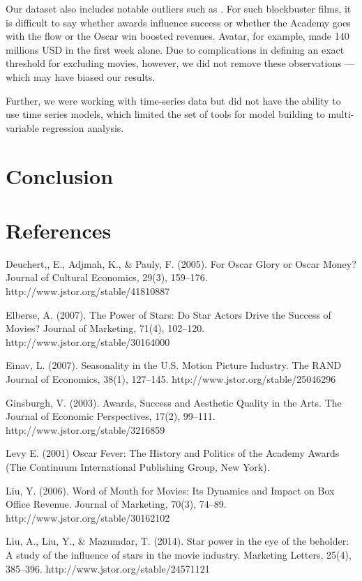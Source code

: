 \documentclass[11pt]{article} %
\begin{document}
Our dataset also includes notable outliers such as . For such blockbuster films, it is difficult to say whether awards influence success or whether the Academy goes with the flow or the Oscar win boosted revenues. Avatar, for example, made 140 millions USD in the first week alone. Due to complications in defining an exact threshold for excluding movies, however, we did not remove these observations — which may have biased our results. 

Further, we were working with time-series data but did not have the ability to use time series models, which limited the set of tools for model building to multi-variable regression analysis. 


\section{Conclusion}

\newpage
\section*{References}
\leftskip 0.3in
\parindent -0.3in

\noindent 

Deuchert,, E., Adjmah, K., & Pauly, F. (2005). For Oscar Glory or Oscar Money? Journal of Cultural Economics, 29(3), 159–176. http://www.jstor.org/stable/41810887 

Elberse, A. (2007). The Power of Stars: Do Star Actors Drive the Success of Movies? Journal of Marketing, 71(4), 102–120. http://www.jstor.org/stable/30164000 

Einav, L. (2007). Seasonality in the U.S. Motion Picture Industry. The RAND Journal of Economics, 38(1), 127–145. http://www.jstor.org/stable/25046296 
 
Ginsburgh, V. (2003). Awards, Success and Aesthetic Quality in the Arts. The Journal of Economic Perspectives, 17(2), 99–111. http://www.jstor.org/stable/3216859 

Levy E. (2001) Oscar Fever: The History and Politics of the Academy Awards (The Continuum International Publishing Group, New York). 

Liu, Y. (2006). Word of Mouth for Movies: Its Dynamics and Impact on Box Office Revenue. Journal of Marketing, 70(3), 74–89. http://www.jstor.org/stable/30162102

Liu, A., Liu, Y., & Mazumdar, T. (2014). Star power in the eye of the beholder: A study of the influence of stars in the movie industry. Marketing Letters, 25(4), 385–396. http://www.jstor.org/stable/24571121
\end{document}

